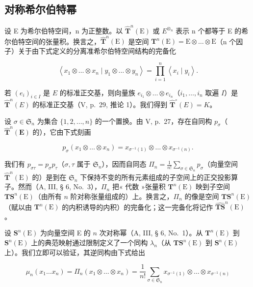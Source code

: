 \subsection{对称希尔伯特幂}

设 E 为希尔伯特空间，n 为正整数。以 \(\hat{\mathbf{T}}^{n}(\mathrm{E})\) 或 \(E^{\otimes_{n}}\) 表示 n 个都等于 E 的希尔伯特空间的张量积。换言之，\(\hat{\mathbf{T}}^{n}(\mathrm{E})\) 是空间 \(\mathbf{T}^{n}(\mathrm{E}) = \mathrm{E} \otimes \ldots \otimes \mathrm{E}\)（n 个因子）关于由下式定义的分离准希尔伯特空间结构的完备化

\[
\left\langle x _ {1} \otimes \dots \otimes x _ {n} \mid y _ {1} \otimes \dots \otimes y _ {n} \right\rangle = \prod_ {i = 1} ^ {n} \left\langle x _ {i} \mid y _ {i} \right\rangle .
\]

若 \((e_i)_{i\in I}\) 是 \(E\) 的标准正交基，则向量族 \(e_{i_1} \otimes \ldots \otimes e_{i_n}\)（\(i_1, \ldots, i_n\) 取遍 \(I\)）是 \(\hat{\mathbf{T}}^n(E)\) 的标准正交基（V, p.~29, 推论 1）。我们得到 \(\hat{\mathbf{T}}^\circ(E) = K\)。

设 \(\sigma \in \mathfrak{S}_n\) 为集合 \(\{1, 2, ..., n\}\) 的一个置换。由 V, p.~27，存在自同构 \(p_{\sigma}\)（\(\hat{\mathbf{T}}^n(\mathbf{E})\) 的），它由下式刻画

\[
p _ {\sigma} (x _ {1} \otimes \dots \otimes x _ {n}) = x _ {\sigma^ {- 1} (1)} \otimes \dots \otimes x _ {\sigma^ {- 1} (n)}.
\]

我们有 \(p_{\sigma \tau} = p_{\sigma}p_{\tau}\)（\(\sigma, \tau\) 属于 \(\mathfrak{S}_n\)），因而自同态 \(\Pi_n = \frac{1}{n!}\sum_{\sigma \in \mathfrak{S}_n}p_\sigma\)（向量空间 \(\hat{\mathbf{T}}^n (\mathrm{E})\) 的）是到在 \(\mathfrak{S}_n\) 下保持不变的所有元素组成的子空间上的正交投影算子。然而（A, III, § 6, No.~3），\(\Pi_n\) 把« 代数 »张量积 \(\mathbf{T}^n (\mathrm{E})\) 映到子空间 \(\mathbf{T}\mathbf{S}^n (\mathrm{E})\)（由所有 \(n\) 阶对称张量组成的）上。换言之，\(\Pi_n\) 的像是空间 \(\mathbf{T}\mathbf{S}^n (\mathrm{E})\)（赋以由 \(\mathbf{T}^n (\mathrm{E})\) 的内积诱导的内积）的完备化；这一完备化将记作 \(\widehat{\mathbf{T}\mathbf{S}}^n (\mathrm{E})\)。

设 \(\mathbf{S}^n (\mathrm{E})\) 为向量空间 E 的 \(n\) 次对称幂（A, III, § 6, No.~1）。从 \(\mathbf{T}^n (\mathrm{E})\) 到 \(\mathbf{S}^n (\mathrm{E})\) 上的典范映射通过限制定义了一个同构 \(\lambda_{n}\)（从 \(\mathbf{TS}^n (\mathrm{E})\) 到 \(\mathbf{S}^n (\mathrm{E})\) 上）。我们立即可以验证，其逆同构由下式给出

\[
\mu_ {n} (x _ {1} \dots x _ {n}) = \Pi_ {n} (x _ {1} \otimes \dots \otimes x _ {n}) = \frac {1}{n !} \sum_ {\sigma \in \mathfrak {S} _ {n}} x _ {\sigma^ {- 1} (1)} \otimes \dots \otimes x _ {\sigma^ {- 1} (n)}\tag{13}
\]

